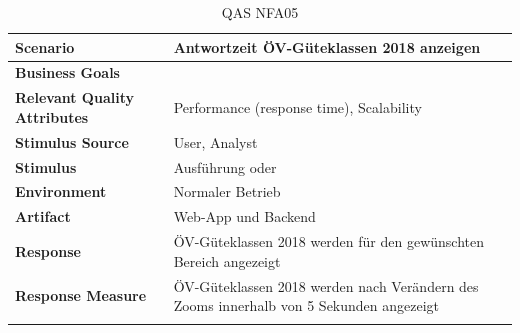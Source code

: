 \begin{longtable}{l p{10.6cm}}
        \toprule
        \textbf{Scenario}
                                & Antwortzeit ÖV-Güteklassen 2018 anzeigen\\
        \midrule
        \textbf{Business Goals}
                                & \\
        \textbf{Relevant Quality Attributes}
                                & Performance (response time), Scalability\\
        \textbf{Stimulus Source}
                                & User, Analyst\\
        \textbf{Stimulus}
                                & Ausführung \nameref{Use Cases:UC06} oder \nameref{Use Cases:UC07}\\
        \textbf{Environment}
                                & Normaler Betrieb\\
        \textbf{Artifact}
                                & Web-App und Backend\\
        \textbf{Response}
                                & ÖV-Güteklassen 2018 werden für den gewünschten Bereich angezeigt\\  
        \textbf{Response Measure}
                                & ÖV-Güteklassen 2018 werden nach Verändern des Zooms innerhalb von 5 Sekunden angezeigt\\                                
        \bottomrule
    \caption{QAS NFA05}
    \label{table:nfa05}
\end{longtable}
